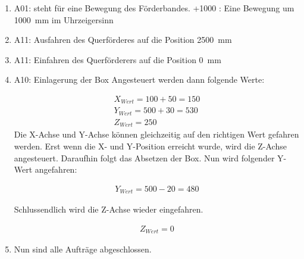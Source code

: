         \begin{enumerate}
            \item A01: steht für eine Bewegung des Förderbandes. 
                \subitem +1000 : Eine Bewegung um \qty{1000}{\milli\meter} im Uhrzeigersinn
            \item A11: Ausfahren des Querförderes auf die Position \qty{2500}{\milli\meter} 
            \item A11: Einfahren des Querförderers auf die Position \qty{0}{\milli\meter}
            \item A10: Einlagerung der Box
                \subitem Angesteuert werden dann folgende Werte:

                \vspace{-6mm}
                    \begin{equation*}
                        \begin{split}
                            X_{Wert} = 100 + 50 = 150 \\
                            Y_{Wert} = 500 + 30 = 530 \\
                            Z_{Wert} = 250
                        \end{split}
                    \end{equation*}
                \subitem Die X-Achse und Y-Achse können gleichzeitig auf den   richtigen Wert gefahren werden. Erst wenn die X- und Y-Position erreicht wurde, wird die Z-Achse angesteuert. 
                \subitem Daraufhin folgt das Absetzen der Box. Nun wird folgender Y-Wert angefahren:

                \vspace{-6mm}
                    \begin{equation*}
                        \begin{split}
                            Y_{Wert} = 500 - 20 = 480
                        \end{split}
                    \end{equation*}

                \subitem Schlussendlich wird die Z-Achse wieder eingefahren.

                \vspace{-6mm}
                    \begin{equation*}
                        \begin{split}
                            Z_{Wert} = 0
                        \end{split}
                    \end{equation*}
            \item Nun sind alle Aufträge abgeschlossen.
        \end{enumerate}

